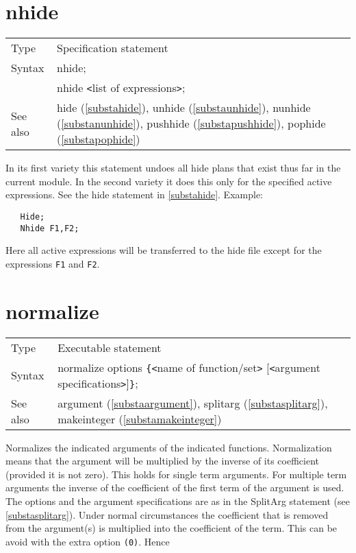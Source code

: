 \section{nhide}
\label{substanhide}

\noindent \begin{tabular}{ll}
Type & Specification statement\\
Syntax & nhide; \\
       & nhide {\tt<}list of expressions{\tt>};
\\ See also & hide (\ref{substahide}),
              unhide (\ref{substaunhide}),
              nunhide (\ref{substanunhide}),
              pushhide (\ref{substapushhide}),
              pophide (\ref{substapophide})
\end{tabular} \vspace{4mm}

\noindent In its first variety this statement undoes all 
hide plans that exist thus far in the current module. In the 
second variety it does this only for the specified active 
expressions. See the hide statement in \ref{substahide}. Example:
\begin{verbatim}
   Hide;
   Nhide F1,F2;
\end{verbatim}
Here all active expressions will be transferred to the hide file except for 
the expressions \verb:F1: and \verb:F2:. \vspace{10mm}


\section{normalize}
\label{substanormalize}

\noindent \begin{tabular}{ll}
Type & Executable statement\\
Syntax & normalize options \verb:{:{\tt<}name of function/set{\tt>}
         [{\tt<}argument specifications{\tt>}]\verb:}:;
\\ See also & argument (\ref{substaargument}), splitarg 
            (\ref{substasplitarg}), makeinteger (\ref{substamakeinteger})
\end{tabular} \vspace{4mm}

\noindent Normalizes the indicated 
arguments of the indicated functions. Normalization means 
that the argument will be multiplied by the inverse of its 
coefficient 
(provided it is not zero). This holds for single term arguments. For 
multiple term arguments the inverse of the coefficient of the first term of 
the argument is used. The options and the argument specifications are as in 
the SplitArg statement (see \ref{substasplitarg}). Under normal 
circumstances the coefficient that is removed from the argument(s) is 
multiplied into the coefficient of the term. This can be avoid with the 
extra option
\verb:(0):. Hence

